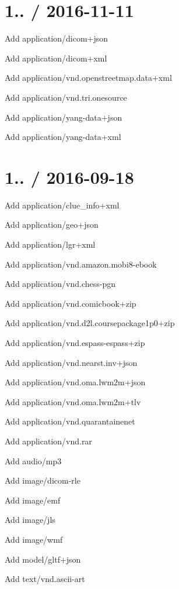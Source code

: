 \section*{1.. / 2016-\/11-\/11 }


\begin{DoxyItemize}
\item Add {\ttfamily application/dicom+json}
\item Add {\ttfamily application/dicom+xml}
\item Add {\ttfamily application/vnd.\+openstreetmap.\+data+xml}
\item Add {\ttfamily application/vnd.\+tri.\+onesource}
\item Add {\ttfamily application/yang-\/data+json}
\item Add {\ttfamily application/yang-\/data+xml}
\end{DoxyItemize}

\section*{1.. / 2016-\/09-\/18 }


\begin{DoxyItemize}
\item Add {\ttfamily application/clue\+\_\+info+xml}
\item Add {\ttfamily application/geo+json}
\item Add {\ttfamily application/lgr+xml}
\item Add {\ttfamily application/vnd.\+amazon.\+mobi8-\/ebook}
\item Add {\ttfamily application/vnd.\+chess-\/pgn}
\item Add {\ttfamily application/vnd.\+comicbook+zip}
\item Add {\ttfamily application/vnd.\+d2l.\+coursepackage1p0+zip}
\item Add {\ttfamily application/vnd.\+espass-\/espass+zip}
\item Add {\ttfamily application/vnd.\+nearst.\+inv+json}
\item Add {\ttfamily application/vnd.\+oma.\+lwm2m+json}
\item Add {\ttfamily application/vnd.\+oma.\+lwm2m+tlv}
\item Add {\ttfamily application/vnd.\+quarantainenet}
\item Add {\ttfamily application/vnd.\+rar}
\item Add {\ttfamily audio/mp3}
\item Add {\ttfamily image/dicom-\/rle}
\item Add {\ttfamily image/emf}
\item Add {\ttfamily image/jls}
\item Add {\ttfamily image/wmf}
\item Add {\ttfamily model/gltf+json}
\item Add {\ttfamily text/vnd.\+ascii-\/art}
\end{DoxyItemize}


